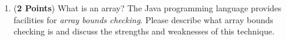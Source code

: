 \documentclass[12pt]{article}
\begin{document}
\begin{enumerate}
\begin{enumerate}


\item ({\bf 2 Points}) What is an array?  The Java programming
  language provides facilities for {\em array bounds checking}.
  Please describe what array bounds checking is and discuss the
  strengths and weaknesses of this technique.

\end{enumerate}

\newpage


  
  


\end{enumerate}
\end{document}
